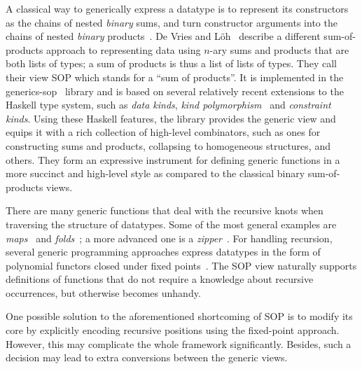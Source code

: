 \documentclass[runningheads]{llncs}
\begin{document}
A classical way to generically express a datatype is to represent its constructors as the chains of nested \emph{binary} sums, and turn constructor arguments into the chains of nested \emph{binary} products~\cite{VanNoort2008,Cheney2002,Loeh2004}\nocite{Rodriguez2008}\nocite{Magalhaes2012}. De Vries and L\"{o}h~\cite{VriLoeh2014} describe a different sum-of-products approach to representing data using $n$-ary sums and products that are both lists of types; a sum of products is thus a list of lists of types. They call their view SOP which stands for a ``sum of products''. It is implemented in the \textsf{generics-sop}~\cite{generics-sop} library and is based on several relatively recent extensions to the Haskell type system, such as \emph{data kinds}, \emph{kind polymorphism}~\cite{Yorgey2012} and \emph{constraint kinds}.
Using these Haskell features, the library provides the generic view and equips it with a rich collection of high-level combinators, such as ones for constructing sums and products, collapsing to homogeneous structures, and others. They form an expressive instrument for defining generic functions in a more succinct and high-level style as compared to the classical binary sum-of-products views.

There are many generic functions that deal with the recursive knots when traversing the structure of datatypes. Some of the most general examples are \emph{maps}~\cite{Magalhaes2010} and \emph{folds}~\cite{Meijer1991}; a more advanced one is a \emph{zipper}~\cite{Huet1997,HiJeLo2004,Adams2010}. For handling recursion, several generic programming approaches express datatypes in the form of polynomial functors closed under fixed points~\cite{MuRec2009,Jansson1997,Loeh2011}. The SOP view naturally supports definitions of functions that do not require a knowledge about recursive occurrences, but otherwise becomes unhandy.

One possible solution to the aforementioned shortcoming of SOP is to modify its core by explicitly encoding recursive positions using the fixed-point approach. However, this may complicate the whole framework significantly. Besides, such a decision may lead to extra conversions between the generic views.
\end{document}

